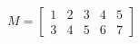 \documentclass{article}
\begin{document}
\[
M=
  \begin{bmatrix}
    1 & 2 & 3 & 4 & 5 \\
    3 & 4 & 5 & 6 & 7
  \end{bmatrix}
\]
\end{document}
